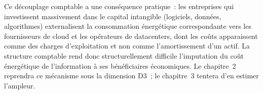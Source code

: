 %
%



%
Ce découplage comptable a une conséquence pratique~: les entreprises qui investissent massivement dans le capital intangible (logiciels, données, algorithmes) externalisent la consommation énergétique correspondante vers les fournisseurs de cloud et les opérateurs de datacenters, dont les coûts apparaissent comme des charges d'exploitation et non comme l'amortissement d'un actif. La structure comptable rend donc structurellement difficile l'imputation du coût énergétique de l'information à ses bénéficiaires économiques. Le chapitre~2 reprendra ce mécanisme sous la dimension D3~; le chapitre~3 tentera d'en estimer l'ampleur.





